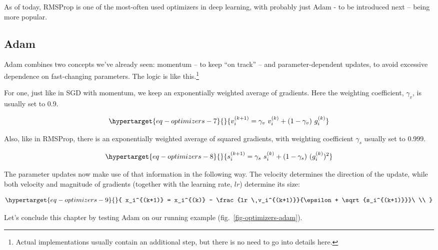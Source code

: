 \documentclass[
  letterpaper,
]{krantz}
\begin{document}
As of today, RMSProp is one of the most-often used optimizers in deep
learning, with probably just Adam - to be introduced next -- being more
popular.

\hypertarget{adam}{%
\subsection{\texorpdfstring{Adam}{Adam}}\label{adam}}

Adam combines two concepts we've already seen: momentum -- to keep ``on
track'' -- and parameter-dependent updates, to avoid excessive
dependence on fast-changing parameters. The logic is like
this.\footnote{Actual implementations usually contain an additional
  step, but there is no need to go into details here.}

For one, just like in SGD with momentum, we keep an exponentially
weighted average of gradients. Here the weighting coefficient,
\(\gamma_v\), is usually set to 0.9.

\begin{equation}\protect\hypertarget{eq-optimizers-7}{}{
v_i^{(k+1)} = \gamma_v \ v_i^{(k)} + (1-\gamma_v) \ g_i^{(k)}
}\label{eq-optimizers-7}\end{equation}

Also, like in RMSProp, there is an exponentially weighted average of
squared gradients, with weighting coefficient \(\gamma_s\) usually set
to 0.999.

\begin{equation}\protect\hypertarget{eq-optimizers-8}{}{
s_i^{(k+1)} = \gamma_s \ s_i^{(k)} + (1-\gamma_s) \ (g_i^{(k)})^2
}\label{eq-optimizers-8}\end{equation}

The parameter updates now make use of that information in the following
way. The velocity determines the direction of the update, while both
velocity and magnitude of gradients (together with the learning rate,
\(lr\)) determine its size:

\begin{equation}\protect\hypertarget{eq-optimizers-9}{}{
x_i^{(k+1)} = x_i^{(k)} - \frac{lr \ 
v_i^{(k+1)}}{\epsilon + \sqrt{s_i^{(k+1)}}}\ \\
}\label{eq-optimizers-9}\end{equation}

Let's conclude this chapter by testing Adam on our running example
(fig.~\ref{fig-optimizers-adam}).
\end{document}
